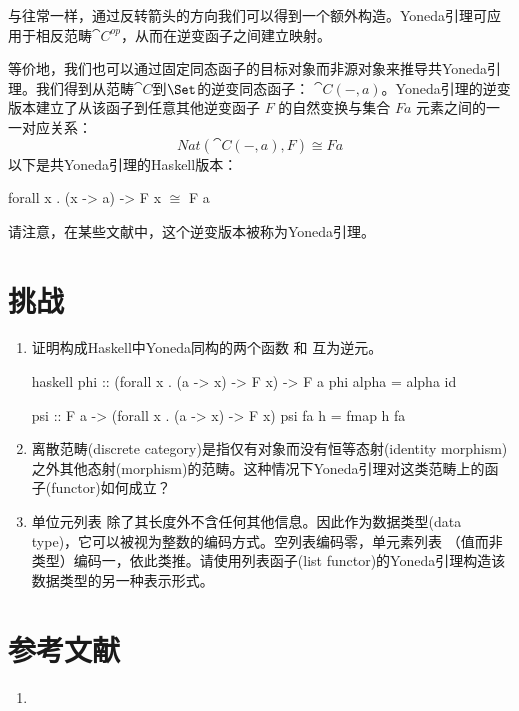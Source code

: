 与往常一样，通过反转箭头的方向我们可以得到一个额外构造。Yoneda引理可应用于相反范畴$\cat{C}^\mathit{op}$，从而在逆变函子之间建立映射。

等价地，我们也可以通过固定同态函子的目标对象而非源对象来推导共Yoneda引理。我们得到从范畴$\cat{C}$到$\Set$的逆变同态函子：
$\cat{C}(-, a)$。Yoneda引理的逆变版本建立了从该函子到任意其他逆变函子 $F$ 的自然变换与集合 $F a$ 元素之间的一一对应关系：
$$\mathit{Nat}(\cat{C}(-, a), F) \cong F a$$
以下是共Yoneda引理的Haskell版本：

\begin{snipv}
forall x . (x -> a) -> F x \ensuremath{\cong} F a
\end{snipv}
请注意，在某些文献中，这个逆变版本被称为Yoneda引理。

\section{挑战}

\begin{enumerate}
  \tightlist
  \item
        证明构成Haskell中Yoneda同构的两个函数  和  互为逆元。

        \begin{snip}{haskell}
phi :: (forall x . (a -> x) -> F x) -> F a
phi alpha = alpha id

psi :: F a -> (forall x . (a -> x) -> F x)
psi fa h = fmap h fa
\end{snip}
  \item
        离散范畴(discrete category)是指仅有对象而没有恒等态射(identity morphism)之外其他态射(morphism)的范畴。这种情况下Yoneda引理对这类范畴上的函子(functor)如何成立？
  \item
        单位元列表 \code{{[}(){]}} 除了其长度外不含任何其他信息。因此作为数据类型(data type)，它可以被视为整数的编码方式。空列表编码零，单元素列表 \code{{[}(){]}}（值而非类型）编码一，依此类推。请使用列表函子(list functor)的Yoneda引理构造该数据类型的另一种表示形式。
\end{enumerate}

\section{参考文献}

\begin{enumerate}
  \tightlist
  \item
\end{enumerate}